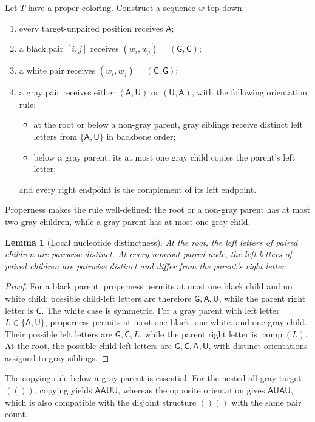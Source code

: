 \documentclass[11pt]{article}
\newtheorem{lemma}[theorem]{Lemma}
\newcommand{\A}{\textsf{A}}
\newcommand{\C}{\textsf{C}}
\newcommand{\G}{\textsf{G}}
\newcommand{\U}{\textsf{U}}
\newcommand{\comp}{\operatorname{comp}}
\begin{document}
Let $T$ have a proper coloring.  Construct a sequence $w$ top-down:
\begin{enumerate}
\item every target-unpaired position receives $\A$;
\item a black pair $[i,j]$ receives $(w_i,w_j)=(\G,\C)$;
\item a white pair receives $(w_i,w_j)=(\C,\G)$;
\item a gray pair receives either $(\A,\U)$ or $(\U,\A)$, with the following orientation rule:
  \begin{itemize}
  \item at the root or below a non-gray parent, gray siblings receive distinct left letters from $\{\A,\U\}$ in backbone order;
  \item below a gray parent, its at most one gray child copies the parent's left letter;
  \end{itemize}
  and every right endpoint is the complement of its left endpoint.
\end{enumerate}
Properness makes the rule well-defined: the root or a non-gray parent has at most two gray children, while a gray parent has at most one gray child.

\begin{lemma}[Local nucleotide distinctness]
\label{lem:local-distinct}
At the root, the left letters of paired children are pairwise distinct.  At every nonroot paired node, the left letters of paired children are pairwise distinct and differ from the parent's right letter.
\end{lemma}

\begin{proof}
For a black parent, properness permits at most one black child and no white child; possible child-left letters are therefore $\G,\A,\U$, while the parent right letter is $\C$.  The white case is symmetric.  For a gray parent with left letter $L\in\{\A,\U\}$, properness permits at most one black, one white, and one gray child.  Their possible left letters are $\G,\C,L$, while the parent right letter is $\comp(L)$.  At the root, the possible child-left letters are $\G,\C,\A,\U$, with distinct orientations assigned to gray siblings.
\end{proof}

The copying rule below a gray parent is essential.  For the nested all-gray target $(())$, copying yields $\A\A\U\U$, whereas the opposite orientation gives $\A\U\A\U$, which is also compatible with the disjoint structure $()()$ with the same pair count.
\end{document}
